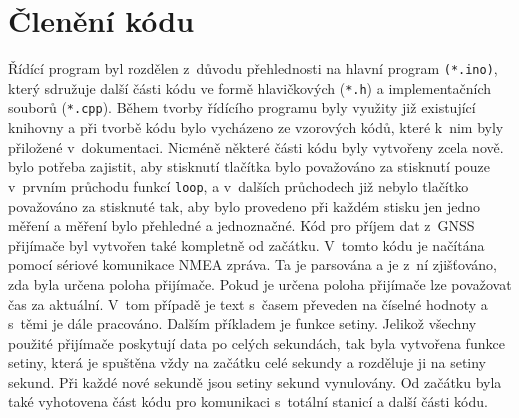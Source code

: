 \section{Členění kódu}
Řídící program byl rozdělen z~důvodu přehlednosti na hlavní program \texttt{(*.ino)}, který sdružuje další části kódu ve formě hlavičkových (\texttt{*.h}) a implementačních souborů (\texttt{*.cpp}). Během tvorby řídícího programu byly využity již existující kniho\-vny a při tvorbě kódu bylo vycházeno ze vzorových kódů, které k~nim byly přiložené v~dokumentaci. Nicméně některé části kódu byly vytvořeny zcela nově.  bylo potřeba zajistit, aby stisknutí tlačítka bylo považováno za stisknutí pouze v~prvním průchodu funkcí \texttt{loop}, a v~dalších průchodech již nebylo tlačítko považováno za stisknuté tak, aby bylo provedeno při každém stisku jen jedno měření a měření bylo přehledné a jednoznačné. Kód pro příjem dat z~GNSS přijímače byl vytvořen také kompletně od začátku. V~tomto kódu je načítána pomocí sériové komunikace NMEA zpráva. Ta je parsována a je z~ní zjišťováno, zda byla určena poloha přijímače. Pokud je určena poloha přijímače lze považovat čas za aktuální. V~tom případě je text s~časem převeden na číselné hodnoty a s~těmi je dále praco\-váno. Dalším pří\-kladem je funkce setiny. Jelikož všechny použité přijímače poskytují data po celých sekundách, tak byla vytvořena funkce setiny, která je spuštěna vždy na začátku celé sekundy a rozděluje ji na setiny sekund. Při každé nové sekundě jsou setiny sekund vynulovány. Od začátku byla také vyhotovena část kódu pro komunikaci s~totální stanicí a další části kódu.

\vspace{1cm}

